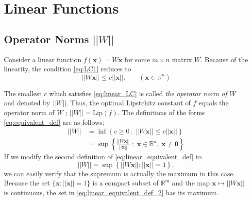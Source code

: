 \documentclass[12pt]{report}
\numberwithin{figure}{chapter}
\theoremstyle{plain}
\theoremstyle{definition}
\theoremstyle{corollary}
\theoremstyle{definition}
\theoremstyle{plain}
\theoremstyle{definition}
\theoremstyle{plain}
\newcommand\bs[1]{\ensuremath{\boldsymbol{#1}}}
\newcommand\bx{\ensuremath{\boldsymbol x}}
\newcommand\lip{\ensuremath{\text{Lip}}}
\begin{document}
\section{Linear Functions}

%
\subsection{Operator Norms \(||W||\)}

Consider a linear function \(f(\bx)=W\bx\) for some \(m\times n\) matrix \(W\).
Because of the linearity, the condition \eqref{eq:LC1} reduces to
\begin{equation}\label{eq:linear_LC}
||W\bx||\le c||\bx||.\qquad(\bx\in\mathbb R^n)
\end{equation}

The smallest \(c\) which satisfies \eqref{eq:linear_LC} is called \emph{the operator norm of \(W\)} and denoted by \(||W||\).
Thus, the optimal Lipstchitz constant of \(f\) equals the operator norm of \(W\) ; \(||W||=\lip(f)\).
The definitions of the forms \eqref{eq:equivalent_def} are as follows;
\begin{equation}\label{eq:linear_equivalent_def}\begin{aligned}
||W||
&=\inf\left\{c\ge0\::\: ||W\bx||\le c||\bx||\right\}\\
&=\sup\left\{\frac{||W\bx||}{||\bx||}\;:\;\bx\in\mathbb R^n,\:\bx\neq\bs0\right\}
\end{aligned}\end{equation}
If we modify the second definition of \eqref{eq:linear_equivalent_def} to
\begin{equation}\label{eq:linear_equivalent_def_2}
||W||=\sup\left\{||W\bx||:||\bx||=1\right\},
\end{equation}
we can easily verify that the supremum is actually the maximum in this case.
Because the set \(\{\bx:||\bx||=1\}\) is a compact subset of \(\mathbb R^m\) and the map \(\bx\mapsto||W\bx||\) is continuous, the set in \eqref{eq:linear_equivalent_def_2} has its maximum.
\end{document}
